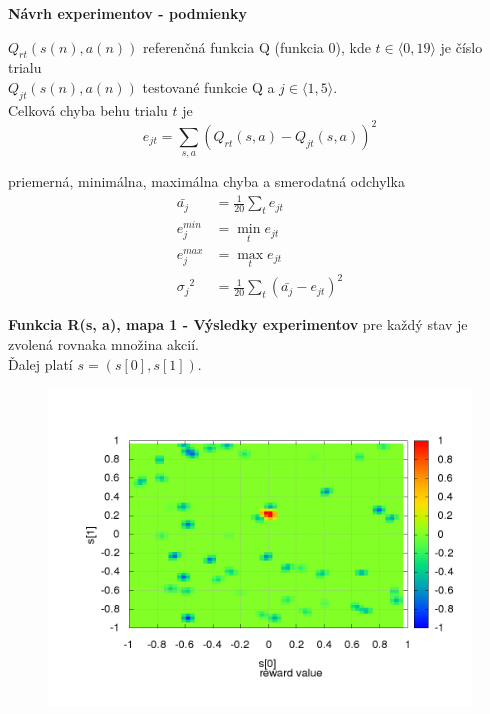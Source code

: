 \documentclass[xcolor=dvipsnames]{beamer}
\begin{document}
\begin{frame}{\bf Návrh experimentov - podmienky}

$Q_{rt}(s(n),a(n))$ referenčná funkcia Q (funkcia 0), kde $t \in \langle 0, 19 \rangle $ je číslo trialu  \\
$Q_{jt}(s(n),a(n))$ testované funkcie Q a $j \in \langle 1, 5 \rangle $. \\

Celková chyba behu trialu $t$ je \\
\begin{equation}
e_{jt} = \sum\limits_{s, a}{(Q_{rt}(s,a) - Q_{jt}(s,a))^2}  \nonumber
\end{equation}

priemerná, minimálna, maximálna chyba a smerodatná odchylka \\
\begin{align}
\bar{a_j} &= \frac{1}{20}\sum\limits_{t}{e_{jt}}  \nonumber \\
{e^{min}_j} &= \min_{t}{e_{jt}}  \nonumber \\
{e^{max}_j} &= \max_{t}{e_{jt}}  \nonumber \\
{\sigma_j}^2 &= \frac{1}{20}\sum\limits_{t}{(\bar{a_j} - e_{jt})^2}  \nonumber
\end{align}

\end{frame}


\begin{frame}{\bf Funkcia R(s, a), mapa 1 - Výsledky experimentov}
pre každý stav je zvolená rovnaka množina akcií. \\
Ďalej platí $s = (s[0], s[1])$.

\begin{figure}[!htb]
\centering
\includegraphics[scale=.4]{../../results_q_learning/map_1/reward_value_surface.png}
\end{figure}

\end{frame}
\end{document}

